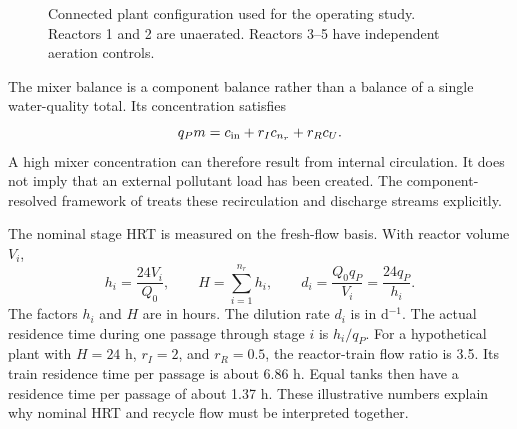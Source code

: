 \begin{figure}[htbp]
\centering
{}
\caption{Connected plant configuration used for the operating study. Reactors 1 and 2 are unaerated. Reactors 3--5 have independent aeration controls.}
\label{fig:plant_configuration}
\end{figure}

The mixer balance is a component balance rather than a balance of a single water-quality total. Its concentration satisfies
\begin{equation}
q_Pm=c_{\rm in}+r_Ic_{n_r}+r_Rc_U.
\label{eq:plant_mixer}
\end{equation}
A high mixer concentration can therefore result from internal circulation. It does not imply that an external pollutant load has been created. The component-resolved framework of \citet{Zhang2026} treats these recirculation and discharge streams explicitly.

The nominal stage HRT is measured on the fresh-flow basis. With reactor volume $V_i$,
\begin{equation}
h_i=\frac{24V_i}{Q_0},\qquad H=\sum_{i=1}^{n_r}h_i,\qquad
d_i=\frac{Q_0q_P}{V_i}=\frac{24q_P}{h_i}.
\label{eq:plant_residence}
\end{equation}
The factors $h_i$ and $H$ are in hours. The dilution rate $d_i$ is in d$^{-1}$. The actual residence time during one passage through stage $i$ is $h_i/q_P$. For a hypothetical plant with $H=24$ h, $r_I=2$, and $r_R=0.5$, the reactor-train flow ratio is 3.5. Its train residence time per passage is about 6.86 h. Equal tanks then have a residence time per passage of about 1.37 h. These illustrative numbers explain why nominal HRT and recycle flow must be interpreted together.

